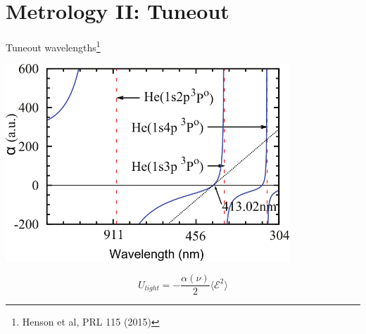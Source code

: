 \documentclass{beamer}
\begin{document}
\section{Metrology II: Tuneout}

\begin{frame}{Tuneout wavelengths\footnote[frame]{Henson et al, PRL 115 (2015)}}
    \begin{center}
        \includegraphics[width=0.8\textwidth]{figures/TO/plz.png}    
    \end{center}
    $$
    U_{light} = -\frac{\alpha(\nu)}{2}\langle\mathcal{E}^2\rangle
    $$
\end{frame}

\end{document}
